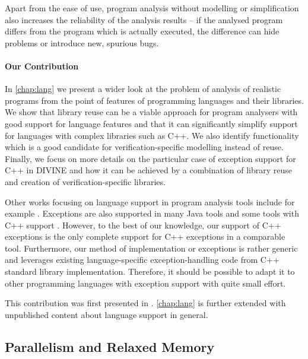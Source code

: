 Apart from the ease of use, program analysis without modelling or simplification also increases the reliability of the analysis results --
if the analysed program differs from the program which is actually executed, the difference can hide problems or introduce new, spurious bugs.

\paragraph{Our Contribution}
In \autoref{chap:lang} we present a wider look at the problem of analysis of realistic
programs from the point of features of programming languages and their libraries.
We show that library reuse can be a viable approach for program analysers with
good support for language features and that it can significantly simplify
support for languages with complex libraries such as C++.
We also identify functionality which is a good candidate for
verification-specific modelling instead of reuse.
Finally, we focus on more details on the particular case of exception support
for C++ in DIVINE and how it can be achieved by a combination of library reuse
and creation of verification-specific libraries.

Other works focusing on language support in program analysis tools include for example .
Exceptions are also supported in many Java tools and some tools with C++ support .
However, to the best of our knowledge, our support of C++ exceptions is the only complete support for C++ exceptions in a comparable tool.
Furthermore, our method of implementation or exceptions is rather generic and leverages existing language-specific exception-handling code from C++ standard library implementation.
Therefore, it should be possible to adapt it to other programming languages with exception support with quite small effort.

This contribution was first presented in . \autoref{chap:lang} is further extended with unpublished content about language support in general.



\subsection{Parallelism and Relaxed Memory}

